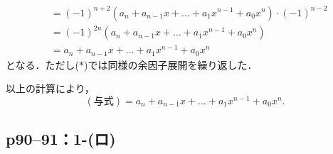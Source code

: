 \documentclass[a4paper,10pt,fleqn]{ltjsarticle}
\begin{document}
\begin{tleftbar}
\begin{align*}
                & = (-1)^{n+2} (a_n + a_{n-1} x + \dots +a_1 x^{n-1} + a_0 x^n) \cdot (-1)^{n-2}                                                                     \\
                & = (-1)^{2n} (a_n + a_{n-1} x + \dots +a_1 x^{n-1} + a_0 x^n)                                                                                       \\
                & = a_n + a_{n-1} x + \dots +a_1 x^{n-1} + a_0 x^n
  \end{align*}
  となる．ただし($\ast$)では同様の余因子展開を繰り返した．

  以上の計算により，
  \[
    (\text{与式}) = a_n + a_{n-1} x + \dots +a_1 x^{n-1} + a_0 x^n.
  \]
\end{tleftbar}


\subsection*{p90--91：1-(ロ)}
\end{document}
